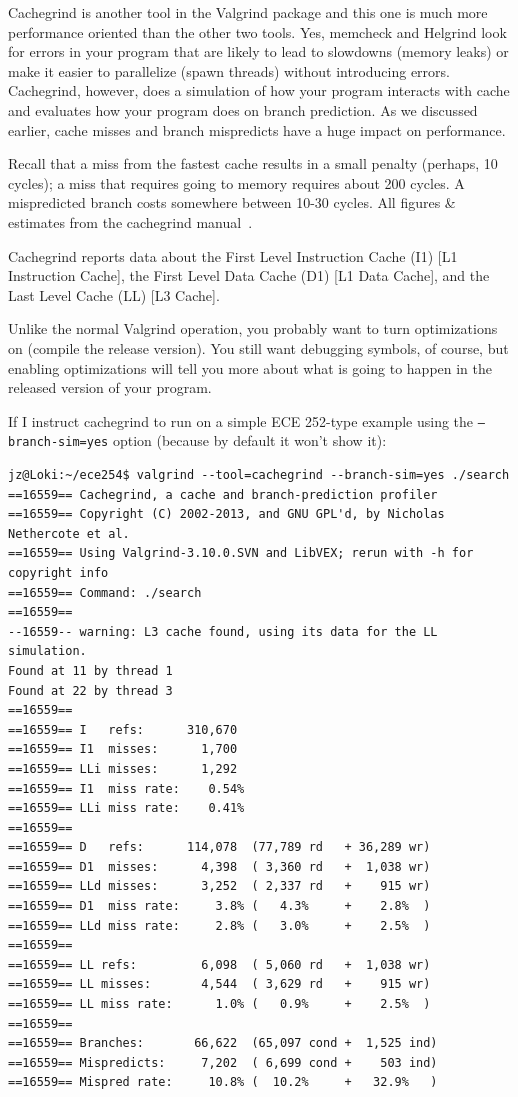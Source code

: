 Cachegrind is another tool in the Valgrind package and this one is much more performance oriented than the other two tools. Yes, memcheck and Helgrind look for errors in your program that are likely to lead to slowdowns (memory leaks) or make it easier to parallelize (spawn threads) without introducing errors. Cachegrind, however, does a simulation of how your program interacts with cache and evaluates how your program does on branch prediction. As we discussed earlier, cache misses and branch mispredicts have a huge impact on performance.

Recall that a miss from the fastest cache results in a small penalty (perhaps, 10 cycles); a miss that requires going to memory requires about 200 cycles. A mispredicted branch costs somewhere between 10-30 cycles. All figures \& estimates from the cachegrind manual~\cite{cachegrind}.

Cachegrind reports data about the First Level Instruction Cache (I1) [L1 Instruction Cache], the First Level Data Cache (D1) [L1 Data Cache], and the Last Level Cache (LL) [L3 Cache].

Unlike the normal Valgrind operation, you probably want to turn optimizations on (compile the release version). You still want debugging symbols, of course, but enabling optimizations will tell you more about what is going to happen in the released version of your program.

If I instruct cachegrind to run on a simple ECE 252-type example using the \texttt{--branch-sim=yes} option (because by default it won't show it):

\begin{lstlisting}
jz@Loki:~/ece254$ valgrind --tool=cachegrind --branch-sim=yes ./search
==16559== Cachegrind, a cache and branch-prediction profiler
==16559== Copyright (C) 2002-2013, and GNU GPL'd, by Nicholas Nethercote et al.
==16559== Using Valgrind-3.10.0.SVN and LibVEX; rerun with -h for copyright info
==16559== Command: ./search
==16559== 
--16559-- warning: L3 cache found, using its data for the LL simulation.
Found at 11 by thread 1 
Found at 22 by thread 3 
==16559== 
==16559== I   refs:      310,670
==16559== I1  misses:      1,700
==16559== LLi misses:      1,292
==16559== I1  miss rate:    0.54%
==16559== LLi miss rate:    0.41%
==16559== 
==16559== D   refs:      114,078  (77,789 rd   + 36,289 wr)
==16559== D1  misses:      4,398  ( 3,360 rd   +  1,038 wr)
==16559== LLd misses:      3,252  ( 2,337 rd   +    915 wr)
==16559== D1  miss rate:     3.8% (   4.3%     +    2.8%  )
==16559== LLd miss rate:     2.8% (   3.0%     +    2.5%  )
==16559== 
==16559== LL refs:         6,098  ( 5,060 rd   +  1,038 wr)
==16559== LL misses:       4,544  ( 3,629 rd   +    915 wr)
==16559== LL miss rate:      1.0% (   0.9%     +    2.5%  )
==16559== 
==16559== Branches:       66,622  (65,097 cond +  1,525 ind)
==16559== Mispredicts:     7,202  ( 6,699 cond +    503 ind)
==16559== Mispred rate:     10.8% (  10.2%     +   32.9%   )
\end{lstlisting}

